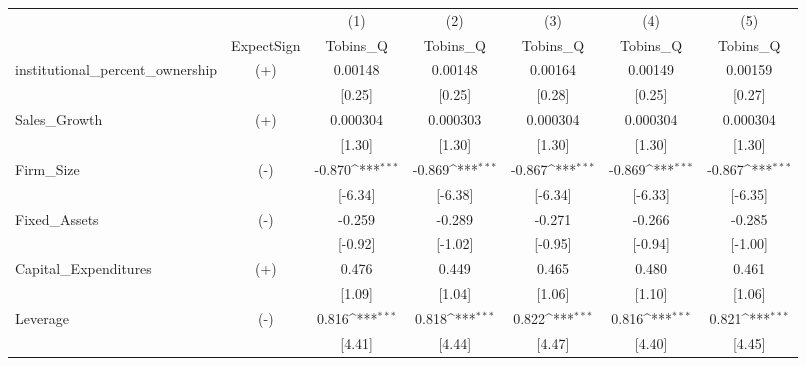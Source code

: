 {
\def\sym#1{\ifmmode^{#1}\else\(^{#1}\)\fi}
\begin{tabular}{lc*{5}{c}}
\hline\hline
            &            &\multicolumn{1}{c}{(1)}&\multicolumn{1}{c}{(2)}&\multicolumn{1}{c}{(3)}&\multicolumn{1}{c}{(4)}&\multicolumn{1}{c}{(5)}\\
            & ExpectSign &\multicolumn{1}{c}{Tobins\_Q}&\multicolumn{1}{c}{Tobins\_Q}&\multicolumn{1}{c}{Tobins\_Q}&\multicolumn{1}{c}{Tobins\_Q}&\multicolumn{1}{c}{Tobins\_Q}\\
\hline
institutional\_percent\_ownership&    (+)     &     0.00148         &     0.00148         &     0.00164         &     0.00149         &     0.00159         \\
            &            &      [0.25]         &      [0.25]         &      [0.28]         &      [0.25]         &      [0.27]         \\
[1em]
Sales\_Growth&    (+)     &    0.000304         &    0.000303         &    0.000304         &    0.000304         &    0.000304         \\
            &            &      [1.30]         &      [1.30]         &      [1.30]         &      [1.30]         &      [1.30]         \\
[1em]
Firm\_Size   &    (-)     &      -0.870\sym{***}&      -0.869\sym{***}&      -0.867\sym{***}&      -0.869\sym{***}&      -0.867\sym{***}\\
            &            &     [-6.34]         &     [-6.38]         &     [-6.34]         &     [-6.33]         &     [-6.35]         \\
[1em]
Fixed\_Assets&    (-)     &      -0.259         &      -0.289         &      -0.271         &      -0.266         &      -0.285         \\
            &            &     [-0.92]         &     [-1.02]         &     [-0.95]         &     [-0.94]         &     [-1.00]         \\
[1em]
Capital\_Expenditures&    (+)     &       0.476         &       0.449         &       0.465         &       0.480         &       0.461         \\
            &            &      [1.09]         &      [1.04]         &      [1.06]         &      [1.10]         &      [1.06]         \\
[1em]
Leverage    &    (-)     &       0.816\sym{***}&       0.818\sym{***}&       0.822\sym{***}&       0.816\sym{***}&       0.821\sym{***}\\
            &            &      [4.41]         &      [4.44]         &      [4.47]         &      [4.40]         &      [4.45]         \\

\end{tabular}}
